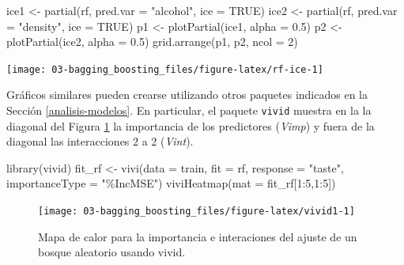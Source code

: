 \documentclass[
  spanish,
]{book}
\newenvironment{Shaded}{\begin{snugshade}}{\end{snugshade}}
\newcommand{\AttributeTok}[1]{\textcolor[rgb]{0.77,0.63,0.00}{#1}}
\newcommand{\ConstantTok}[1]{\textcolor[rgb]{0.00,0.00,0.00}{#1}}
\newcommand{\DecValTok}[1]{\textcolor[rgb]{0.00,0.00,0.81}{#1}}
\newcommand{\FloatTok}[1]{\textcolor[rgb]{0.00,0.00,0.81}{#1}}
\newcommand{\FunctionTok}[1]{\textcolor[rgb]{0.00,0.00,0.00}{#1}}
\newcommand{\NormalTok}[1]{#1}
\newcommand{\OtherTok}[1]{\textcolor[rgb]{0.56,0.35,0.01}{#1}}
\newcommand{\SpecialCharTok}[1]{\textcolor[rgb]{0.00,0.00,0.00}{#1}}
\newcommand{\StringTok}[1]{\textcolor[rgb]{0.31,0.60,0.02}{#1}}
\theoremstyle{break}
\theoremstyle{definition}
\theoremstyle{definition}
\theoremstyle{definition}
\theoremstyle{definition}
\theoremstyle{remark}
\begin{document}
\begin{Shaded}
\begin{Highlighting}[]
\NormalTok{ice1 }\OtherTok{\textless{}{-}} \FunctionTok{partial}\NormalTok{(rf, }\AttributeTok{pred.var =} \StringTok{"alcohol"}\NormalTok{, }\AttributeTok{ice =} \ConstantTok{TRUE}\NormalTok{)}
\NormalTok{ice2 }\OtherTok{\textless{}{-}} \FunctionTok{partial}\NormalTok{(rf, }\AttributeTok{pred.var =} \StringTok{"density"}\NormalTok{, }\AttributeTok{ice =} \ConstantTok{TRUE}\NormalTok{)}
\NormalTok{p1 }\OtherTok{\textless{}{-}} \FunctionTok{plotPartial}\NormalTok{(ice1, }\AttributeTok{alpha =} \FloatTok{0.5}\NormalTok{)}
\NormalTok{p2 }\OtherTok{\textless{}{-}} \FunctionTok{plotPartial}\NormalTok{(ice2, }\AttributeTok{alpha =} \FloatTok{0.5}\NormalTok{)}
\FunctionTok{grid.arrange}\NormalTok{(p1, p2, }\AttributeTok{ncol =} \DecValTok{2}\NormalTok{)}
\end{Highlighting}
\end{Shaded}

\begin{center}\texttt{[image: 03-bagging\_boosting\_files/figure-latex/rf-ice-1]} \end{center}

Gráficos similares pueden crearse utilizando otros paquetes indicados en la Sección \ref{analisis-modelos}. En particular, el paquete \texttt{vivid} muestra en la la diagonal del Figura \ref{fig:vivid1} la importancia de los predictores (\emph{Vimp}) y fuera de la diagonal las interacciones 2 a 2 (\emph{Vint}).

\begin{Shaded}
\begin{Highlighting}[]
\FunctionTok{library}\NormalTok{(vivid)}
\NormalTok{fit\_rf  }\OtherTok{\textless{}{-}} \FunctionTok{vivi}\NormalTok{(}\AttributeTok{data =}\NormalTok{ train, }\AttributeTok{fit =}\NormalTok{ rf, }\AttributeTok{response =} \StringTok{"taste"}\NormalTok{, }\AttributeTok{importanceType =} \StringTok{"\%IncMSE"}\NormalTok{)}
\FunctionTok{viviHeatmap}\NormalTok{(}\AttributeTok{mat =}\NormalTok{ fit\_rf[}\DecValTok{1}\SpecialCharTok{:}\DecValTok{5}\NormalTok{,}\DecValTok{1}\SpecialCharTok{:}\DecValTok{5}\NormalTok{])}
\end{Highlighting}
\end{Shaded}

\begin{figure}[!htb]

{\centering \texttt{[image: 03-bagging\_boosting\_files/figure-latex/vivid1-1]} 

}

\caption{Mapa de calor para la importancia e interaciones del ajuste de un bosque aleatorio usando vivid.}\label{fig:vivid1}
\end{figure}
\end{document}
